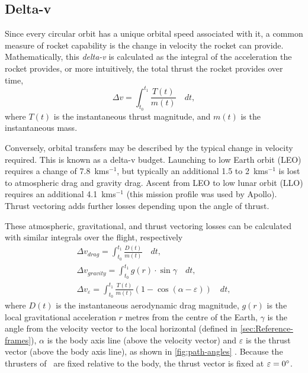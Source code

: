 \subsection{Delta-v} \label{sub:Delta-v}

Since every circular orbit has a unique orbital speed associated with it, a common measure of rocket capability is the change in velocity the rocket can provide. Mathematically, this \emph{delta-v} is calculated as the integral of the acceleration the rocket provides, or more intuitively, the total thrust the rocket provides over time,
\begin{equation}\label{eq:Delta-V}
\Delta v=\int_{t_{0}}^{t_{1}}\frac{T(t)}{m(t)}\quad dt,
\end{equation}
where $T(t)$ is the instantaneous thrust magnitude, and $m(t)$ is the instantaneous mass.

Conversely, orbital transfers may be described by the typical change in velocity required. This is known as a delta-v budget. Launching to low Earth orbit (LEO) requires a change of 7.8~kms$^{-1}$, but typically an additional 1.5 to 2~kms$^{-1}$ is lost to atmospheric drag and gravity drag. Ascent from LEO to low lunar orbit (LLO) requires an additional 4.1~kms$^{-1}$ (this mission profile was used by Apollo). Thrust vectoring adds further losses depending upon the angle of thrust. 

These atmospheric, gravitational, and thrust vectoring losses can be calculated with similar integrals over the flight, respectively
\begin{subequations} \label{eq:Delta-Vs}
\begin{gather}
\Delta v_{drag}=\int_{t_0}^{t_1}\frac{D(t)}{m(t)}\quad dt \label{eq:drag-penalty}, \\
\Delta v_{gravity}=\int_{t_0}^{t_1}g(r)\cdot\sin\gamma\quad dt \label{eq:gravity-penalty}, \\
\Delta v_\varepsilon=\int_{t_0}^{t_1}\frac{T(t)}{m(t)}(1-\cos(\alpha-\varepsilon))\quad dt \label{eq:thrust-vectoring-penalty},
\end{gather}
\end{subequations}
where $D(t)$ is the instantaneous aerodynamic drag magnitude, $g(r)$ is the local gravitational acceleration $r$ metres from the centre of the Earth, $\gamma$ is the angle from the velocity vector to the local horizontal (defined in \autoref{sec:Reference-frames}), $\alpha$ is the body axis line (above the velocity vector) and $\varepsilon$ is the thrust vector (above the body axis line), as shown in \autoref{fig:path-angles} \parencite{Tetlow2003}. Because the thrusters of \BW\ are fixed relative to the body, the thrust vector is fixed at $\varepsilon=0^\circ$.

